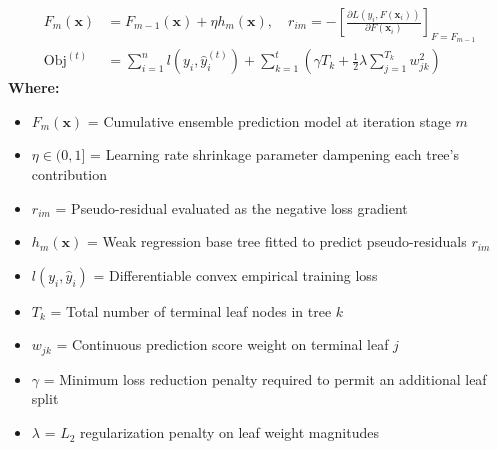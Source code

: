 \begin{formulabox}
\begin{align*}
    F_m(\mathbf{x}) &= F_{m-1}(\mathbf{x}) + \eta h_m(\mathbf{x}), \quad r_{im} = -\left[ \frac{\partial L(y_i, F(\mathbf{x}_i))}{\partial F(\mathbf{x}_i)} \right]_{F=F_{m-1}} \\[4pt]
    \operatorname{Obj}^{(t)} &= \sum_{i=1}^n l(y_i, \hat{y}_i^{(t)}) + \sum_{k=1}^t \left( \gamma T_k + \frac{1}{2} \lambda \sum_{j=1}^{T_k} w_{jk}^2 \right)
\end{align*}
\textbf{Where:}
\begin{itemize}[noitemsep, topsep=1pt]
    \item $F_m(\mathbf{x})$ = Cumulative ensemble prediction model at iteration stage $m$
    \item $\eta \in (0, 1]$ = Learning rate shrinkage parameter dampening each tree's contribution
    \item $r_{im}$ = Pseudo-residual evaluated as the negative loss gradient
    \item $h_m(\mathbf{x})$ = Weak regression base tree fitted to predict pseudo-residuals $r_{im}$
    \item $l(y_i, \hat{y}_i)$ = Differentiable convex empirical training loss
    \item $T_k$ = Total number of terminal leaf nodes in tree $k$
    \item $w_{jk}$ = Continuous prediction score weight on terminal leaf $j$
    \item $\gamma$ = Minimum loss reduction penalty required to permit an additional leaf split
    \item $\lambda$ = $L_2$ regularization penalty on leaf weight magnitudes
\end{itemize}
\end{formulabox}

